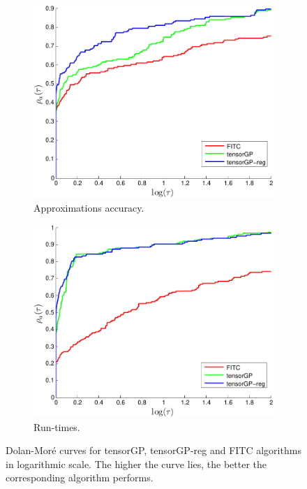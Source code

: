 \begin{figure}
  \centering
  \begin{subfigure}[b]{0.45\textwidth}
      \includegraphics[width=\textwidth]{figures/gp_on_grid/dolan_more.pdf}
      \caption{Approximations accuracy.}
      \label{fig:dolan_more}
  \end{subfigure}
  \begin{subfigure}[b]{0.45\textwidth}
      \includegraphics[width=\textwidth]{figures/gp_on_grid/dolan_more_time.pdf}
      \caption{Run-times.}
      \label{fig:dolan_more_time}
  \end{subfigure}
  \caption{Dolan-Mor\'e curves for tensorGP, tensorGP-reg and FITC algorithms
        in logarithmic scale.
        The higher the curve lies, the better the corresponding algorithm performs.}
\end{figure}

